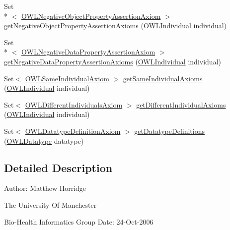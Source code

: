 \begin{DoxyCompactItemize}
\item 
Set\\*
$<$ \hyperlink{interfaceorg_1_1semanticweb_1_1owlapi_1_1model_1_1_o_w_l_negative_object_property_assertion_axiom}{O\-W\-L\-Negative\-Object\-Property\-Assertion\-Axiom} $>$ \hyperlink{interfaceorg_1_1semanticweb_1_1owlapi_1_1model_1_1_o_w_l_ontology_aef72d00cdcdc78095e3457cc324e206f}{get\-Negative\-Object\-Property\-Assertion\-Axioms} (\hyperlink{interfaceorg_1_1semanticweb_1_1owlapi_1_1model_1_1_o_w_l_individual}{O\-W\-L\-Individual} individual)
\item 
Set\\*
$<$ \hyperlink{interfaceorg_1_1semanticweb_1_1owlapi_1_1model_1_1_o_w_l_negative_data_property_assertion_axiom}{O\-W\-L\-Negative\-Data\-Property\-Assertion\-Axiom} $>$ \hyperlink{interfaceorg_1_1semanticweb_1_1owlapi_1_1model_1_1_o_w_l_ontology_adc7ff56ebab139642160571e04f77668}{get\-Negative\-Data\-Property\-Assertion\-Axioms} (\hyperlink{interfaceorg_1_1semanticweb_1_1owlapi_1_1model_1_1_o_w_l_individual}{O\-W\-L\-Individual} individual)
\item 
Set$<$ \hyperlink{interfaceorg_1_1semanticweb_1_1owlapi_1_1model_1_1_o_w_l_same_individual_axiom}{O\-W\-L\-Same\-Individual\-Axiom} $>$ \hyperlink{interfaceorg_1_1semanticweb_1_1owlapi_1_1model_1_1_o_w_l_ontology_a349f8d2d885fe39b41bf5d1f3e19ebb7}{get\-Same\-Individual\-Axioms} (\hyperlink{interfaceorg_1_1semanticweb_1_1owlapi_1_1model_1_1_o_w_l_individual}{O\-W\-L\-Individual} individual)
\item 
Set$<$ \hyperlink{interfaceorg_1_1semanticweb_1_1owlapi_1_1model_1_1_o_w_l_different_individuals_axiom}{O\-W\-L\-Different\-Individuals\-Axiom} $>$ \hyperlink{interfaceorg_1_1semanticweb_1_1owlapi_1_1model_1_1_o_w_l_ontology_ad68bb626bf0c8f767d06ec6259cf0862}{get\-Different\-Individual\-Axioms} (\hyperlink{interfaceorg_1_1semanticweb_1_1owlapi_1_1model_1_1_o_w_l_individual}{O\-W\-L\-Individual} individual)
\item 
Set$<$ \hyperlink{interfaceorg_1_1semanticweb_1_1owlapi_1_1model_1_1_o_w_l_datatype_definition_axiom}{O\-W\-L\-Datatype\-Definition\-Axiom} $>$ \hyperlink{interfaceorg_1_1semanticweb_1_1owlapi_1_1model_1_1_o_w_l_ontology_ae645826b274cf2f177ae8d1addfa4e35}{get\-Datatype\-Definitions} (\hyperlink{interfaceorg_1_1semanticweb_1_1owlapi_1_1model_1_1_o_w_l_datatype}{O\-W\-L\-Datatype} datatype)
\end{DoxyCompactItemize}


\subsection{Detailed Description}
Author\-: Matthew Horridge\par
 The University Of Manchester\par
 Bio-\/\-Health Informatics Group Date\-: 24-\/\-Oct-\/2006 

